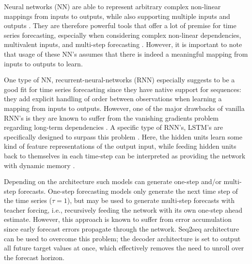 \documentclass[format=sigconf, review=false, screen=true]{acmart}
\begin{document}
Neural networks (NN) are able to represent arbitrary complex non-linear mappings from inputs to outputs, while also supporting multiple inputs and outputs \citep{brownlee2018deep}. They are therefore powerful tools that offer a lot of premise for time series forecasting, especially when considering complex non-linear dependencies, multivalent inputs, and multi-step forecasting \citep{brownlee2018deep}. However, it is important to note that usage of these NN's assumes that there is indeed a meaningful mapping from inputs to outputs to learn. 

One type of NN, recurrent-neural-networks (RNN) especially suggests to be a good fit for time series forecasting since they have native support for sequences: they add explicit handling of order between observations when learning a mapping from inputs to outputs. However, one of the major drawbacks of vanilla RNN's is they are known to suffer from the vanishing gradients problem regarding long-term dependencies \citep{hochreiter1998vanishing}. A specific type of RNN's, LSTM's are specifically designed to surpass this problem \citep{hochreiter1997long}. Here, the hidden units learn some kind of feature representations of the output input, while feeding hidden units back to themselves in each time-step can be interpreted as providing the network with dynamic memory \citep{benidis2020neural}.

Depending on the architecture such models can generate one-step and/or multi-step forecasts. One-step forecasting models only generate the next time step of the time series ($\tau = 1$), but may be used to generate multi-step forecasts with teacher forcing, i.e., recursively feeding the network with its own one-step ahead estimate. However, this approach is known to suffer from error accumulation since early forecast errors propagate through the network. Seq2seq architecture can be used to overcome this problem; the decoder architecture is set to output all future target values at once, which effectively removes the need to unroll over the forecast horizon. 

\end{document}
